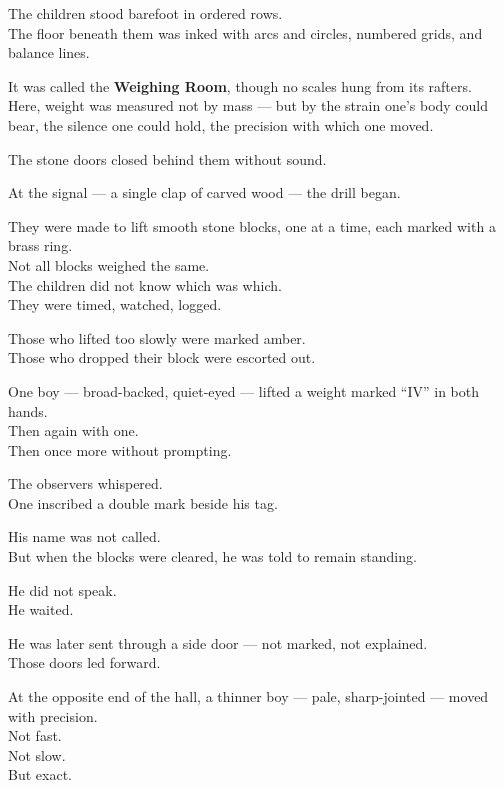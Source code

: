 \documentclass[9pt]{article}
\begin{document}
The children stood barefoot in ordered rows.\\
The floor beneath them was inked with arcs and circles, numbered grids, and balance lines.

It was called the \textbf{Weighing Room}, though no scales hung from its rafters.\\
Here, weight was measured not by mass — but by the strain one’s body could bear, the silence one could hold, the precision with which one moved.

The stone doors closed behind them without sound.

\vspace{1em}

At the signal — a single clap of carved wood — the drill began.

They were made to lift smooth stone blocks, one at a time, each marked with a brass ring.\\
Not all blocks weighed the same.\\
The children did not know which was which.\\
They were timed, watched, logged.

Those who lifted too slowly were marked amber.\\
Those who dropped their block were escorted out.

\vspace{1em}

One boy — broad-backed, quiet-eyed — lifted a weight marked “IV” in both hands.\\
Then again with one.\\
Then once more without prompting.

The observers whispered.\\
One inscribed a double mark beside his tag.

His name was not called.\\
But when the blocks were cleared, he was told to remain standing.

He did not speak.\\
He waited.

He was later sent through a side door — not marked, not explained.\\
Those doors led forward.

\vspace{1em}

At the opposite end of the hall, a thinner boy — pale, sharp-jointed — moved with precision.\\
Not fast.\\
Not slow.\\
But exact.
\end{document}
